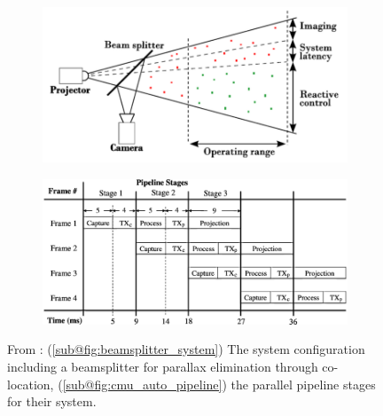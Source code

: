 \begin{figure}[H]
    \centering
    \begin{subfigure}{.49\textwidth}
        \centering
        \includegraphics[width=1\textwidth]{assets/beamsplitter_automotive_system.png}
        \caption{}
        \label{fig:beamsplitter_system}
    \end{subfigure}
    \hfill
    \begin{subfigure}{.49\textwidth}
        \centering
        \includegraphics[width=1\textwidth]{assets/cmu_auto_pipeline.png}
        \caption{}
        \label{fig:cmu_auto_pipeline}
    \end{subfigure}
    \caption{From \cite{decharetteFastReactiveControl2012}: (\ref{sub@fig:beamsplitter_system}) The system configuration including a beamsplitter for parallax elimination through co-location, (\ref{sub@fig:cmu_auto_pipeline}) the parallel pipeline stages for their system.}
    \label{fig:decharette}
\end{figure}


